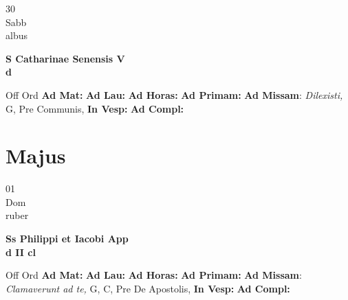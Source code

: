 \documentclass[10pt, openany]{book}
\begin{document}
    \begin{center}
        \begin{minipage}{3.5in}
            \vspace{2em}
            \begin{minipage}{0.5in}
                {\Huge 30} \\
                {\normalsize Sabb} \\
                {\normalsize albus}
            \end{minipage}
            \begin{minipage}{3.0in}
                \textbf{ \large S Catharinae Senensis V \\
                \textnormal{\normalsize d}} \\ 
            \end{minipage}
            \begin{justify}Off Ord
                \textbf{Ad Mat: }
                \textbf{Ad Lau: }
                \textbf{Ad Horas: }
                \textbf{Ad Primam: }\textbf{Ad Missam}: \textit{Dilexisti,} G, Pre Communis,  
                \textbf{In Vesp: }
                \textbf{Ad Compl: }
            \end{justify}
        \end{minipage}
    \end{center}

    \chapter{Majus}
                    
    \begin{center}
        \begin{minipage}{3.5in}
            \vspace{2em}
            \begin{minipage}{0.5in}
                {\Huge 01} \\
                {\normalsize Dom} \\
                {\normalsize ruber}
            \end{minipage}
            \begin{minipage}{3.0in}
                \textbf{ \large Ss Philippi et Iacobi App \\
                \textnormal{\normalsize d II cl}} \\ 
            \end{minipage}
            \begin{justify}Off Ord
                \textbf{Ad Mat: }
                \textbf{Ad Lau: }
                \textbf{Ad Horas: }
                \textbf{Ad Primam: }\textbf{Ad Missam}: \textit{Clamaverunt ad te,} G, C, Pre De Apostolis,  
                \textbf{In Vesp: }
                \textbf{Ad Compl: }
            \end{justify}
        \end{minipage}
    \end{center}
\end{document}
